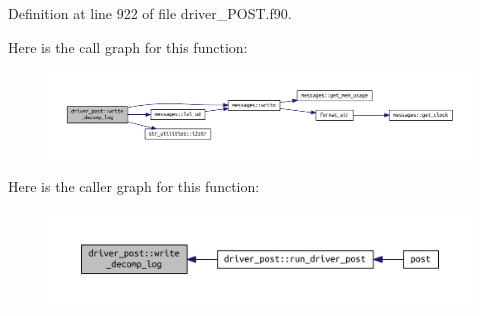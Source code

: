 Definition at line 922 of file driver\+\_\+\+P\+O\+S\+T.\+f90.

Here is the call graph for this function\+:
\nopagebreak
\begin{figure}[H]
\begin{center}
\leavevmode
\includegraphics[width=350pt]{namespacedriver__post_a4981c6c0e63b862c92ba240f43e22e77_cgraph}
\end{center}
\end{figure}
Here is the caller graph for this function\+:
\nopagebreak
\begin{figure}[H]
\begin{center}
\leavevmode
\includegraphics[width=350pt]{namespacedriver__post_a4981c6c0e63b862c92ba240f43e22e77_icgraph}
\end{center}
\end{figure}
